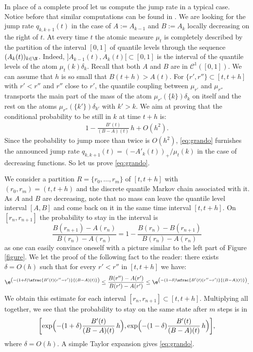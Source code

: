 \begin{ex}
In place of a complete proof let us compute the jump rate in a typical case. Notice before that similar computations can be found in \cite[\S 4]{Ju_ejp}. We are looking for the jump rate $q_{k,k+1}(t)$ in the case of $A:=A_{k-1}$ and $B:=A_k$ locally decreasing on the right of $t$. At every time $t$ the atomic measure $\mu_t$ is completely described by the partition of the interval $[0,1]$ of quantile levels through the sequence $(A_k(t))_{k\in \N}$. Indeed, $]A_{k-1}(t),A_k(t)[\subset [0,1]$ is the interval
of the quantile levels of the atom $\mu_t(k)\delta_k$. Recall that both $A$ and $B$ are in $\mathcal{C}^1([0,1])$. We can assume that $h$ is so small that $B(t+h)>A(t)$. For $\{r',r''\}\subset[t,t+h]$ with $r'<r''$ and $r''$ close to $r'$, the quantile coupling between $\mu_{r'}$ and $\mu_{r''}$ transports the main part of the mass of the atom $\mu_{r'}(\{k\})\delta_k$ on itself and the rest on the atoms $\mu_{r''}(\{k'\})\delta_{k'}$ with $k'>k$. We aim at proving that the conditional probability to be still in $k$ at time $t+h$ is:\vspace*{-3pt}
\begin{align}\label{eq:grando}
1-\frac{B'(t)}{(B-A)(t)}\,h+O(h^2).
\end{align}
Since the probability to jump more than twice is $O(h^2)$, \eqref{eq:grando} furnishes the announced jump rate $q_{k,k+1}(t)=(-A'_k(t))_+/\mu_t(k)$ in the case of decreasing functions. So let us prove \eqref{eq:grando}.

We consider a partition $R=\{r_0,\ldots,r_{m}\}$ of $[t,t+h]$ with $(r_0,r_{m})=(t,t+h)$ and the discrete quantile Markov chain associated with it. As $A$ and $B$ are decreasing, note that no mass can leave the quantile level interval $[A,B]$ and come back on it in the same time interval $[t,t+h]$. On $[r_n,r_{n+1}]$ the probability to stay in the interval is
\[
\frac{B(r_{n+1})-A(r_n)}{B(r_n)-A(r_n)}=1-\frac{B(r_n)-B(r_{n+1})}{B(r_n)-A(r_n)}
\]
as one can easily convince oneself with a picture similar to the left part of Figure \ref{figure}. We let the proof of the following fact to the reader: there exists $\delta=O(h)$ such that for every $r'<r''$ in $[t,t+h]$ we have:
\[\e^{\left(-(1+\delta)\sfrac{B'(t)(r''-r')}{(B-A)(t)}\right)}\leq \frac{B(r'')-A(r')}{B(r')-A(r')}\leq \e^{\left(-(1-\delta)\sfrac{B'(t)(r''-r')}{(B-A)(t)}\right)}.\]
We obtain this estimate for each interval $[r_n,r_{n+1}]\subset [t,t+h]$. Multiplying all together, we see that the probability to stay on the same state after $m$ steps is in
\[
\biggl[\exp\Bigl(-(1+\delta)\frac{B'(t)}{(B-A)(t)}\,h \Bigr),\exp\Bigl(-(1-\delta)\frac{B'(t)}{(B-A)(t)}\,h \Bigr)\biggr],
\]
where $\delta=O(h)$. A simple Taylor expansion gives \eqref{eq:grando}.\end{ex}

